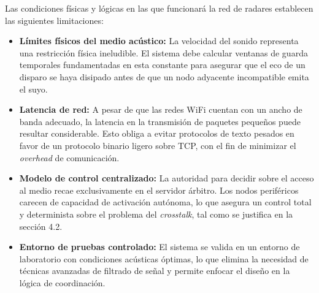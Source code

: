 Las condiciones físicas y lógicas en las que funcionará la red de radares establecen las siguientes limitaciones:

\begin{itemize}
    \item \textbf{Límites físicos del medio acústico:} La velocidad del sonido representa una restricción física ineludible. El sistema debe calcular ventanas de guarda temporales fundamentadas en esta constante para asegurar que el eco de un disparo se haya disipado antes de que un nodo adyacente incompatible emita el suyo.
    \item \textbf{Latencia de red:} A pesar de que las redes WiFi cuentan con un ancho de banda adecuado, la latencia en la transmisión de paquetes pequeños puede resultar considerable. Esto obliga a evitar protocolos de texto pesados en favor de un protocolo binario ligero sobre TCP, con el fin de minimizar el \textit{overhead} de comunicación.
    \item \textbf{Modelo de control centralizado:} La autoridad para decidir sobre el acceso al medio recae exclusivamente en el servidor árbitro. Los nodos periféricos carecen de capacidad de activación autónoma, lo que asegura un control total y determinista sobre el problema del \textit{crosstalk}, tal como se justifica en la sección 4.2.
    \item \textbf{Entorno de pruebas controlado:} El sistema se valida en un entorno de laboratorio con condiciones acústicas óptimas, lo que elimina la necesidad de técnicas avanzadas de filtrado de señal y permite enfocar el diseño en la lógica de coordinación.
\end{itemize}

